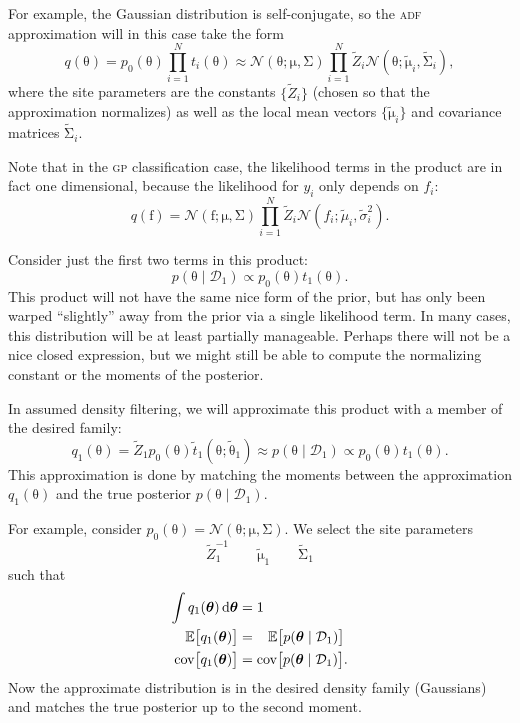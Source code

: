 \documentclass{article}
\newcommand{\acro}[1]{\textsc{\MakeLowercase{#1}}}
\newcommand{\given}{\mid}
\newcommand{\mc}[1]{\mathcal{#1}}
\newcommand{\data}{\mc{D}}
\newcommand{\intd}[1]{\,\mathrm{d}{#1}}
\newcommand{\mat}[1]{\bm{\mathrm{#1}}}
\renewcommand{\vec}[1]{\bm{\mathrm{#1}}}
\DeclareMathOperator{\cov}{cov}
\begin{document}
For example, the Gaussian distribution is self-conjugate, so the
\acro{ADF} approximation will in this case take the form
\[
  q(\vec{\theta})
  =
  p_0(\vec{\theta})
  \prod_{i=1}^N t_i(\vec{\theta})
  \approx
  \mc{N}(\vec{\theta}; \vec{\mu}, \mat{\Sigma})
  \prod_{i=1}^N
  \tilde{Z}_i
  \mc{N}(\vec{\theta}; \tilde{\vec{\mu}}_i, \tilde{\mat{\Sigma}}_i),
\]
where the site parameters are the constants $\{\tilde{Z}_i\}$ (chosen
so that the approximation normalizes) as well as the local mean
vectors $\{\tilde{\vec{\mu}}_i\}$ and covariance matrices
$\tilde{\mat{\Sigma}}_i$.

Note that in the \acro{GP} classification case, the likelihood terms
in the product are in fact one dimensional, because the likelihood for
$y_i$ only depends on $f_i$:
\[
  q(\vec{f})
  =
  \mc{N}(\vec{f}; \vec{\mu}, \mat{\Sigma})
  \prod_{i=1}^N
  \tilde{Z}_i
  \mc{N}(f_i; \tilde{\mu}_i, \tilde{\sigma}^2_i).
\]

Consider just the first two terms in this product:
\[
  p(\vec{\theta} \given \data_1)
  \propto
  p_0(\vec{\theta})
  t_1(\vec{\theta}).
\]
This product will not have the same nice form of the prior, but has
only been warped ``slightly'' away from the prior via a single
likelihood term.  In many cases, this distribution will be at least
partially manageable.  Perhaps there will not be a nice closed
expression, but we might still be able to compute the normalizing
constant or the moments of the posterior.

In assumed density filtering, we will approximate this product with a
member of the desired family:
\[
  q_1(\vec{\theta})
  =
  \tilde{Z}_1
  p_0(\vec{\theta})
  \tilde{t}_1(\vec{\theta}; \tilde{\vec{\theta}}_1)
  \approx
  p(\vec{\theta} \given \data_1)
  \propto
  p_0(\vec{\theta})
  t_1(\vec{\theta}).
\]
This approximation is done by matching the moments between the
approximation $q_1(\vec{\theta})$ and the true posterior
$p(\vec{\theta} \given \data_1)$.

For example, consider $p_0(\vec{\theta}) = \mc{N}(\vec{\theta};
\vec{\mu}, \mat{\Sigma})$.  We select the site parameters
\[
  \tilde{Z}_1^{-1}
  \qquad
  \tilde{\vec{\mu}}_1 \qquad
  \tilde{\mat{\Sigma}}_1
\]
such that
\begin{align*}
  \int q_1(\vec{\theta}) \intd{\vec{\theta}} &= 1 \\
  \mathbb{E}\bigl[q_1(\vec{\theta})\bigr] &= \mspace{14.5mu} \mathbb{E}\bigl[ p(\vec{\theta} \given \data_1) \bigr] \\
  \cov\bigl[q_1(\vec{\theta})\bigr] &= \cov\bigl[ p(\vec{\theta} \given \data_1) \bigr].
\end{align*}
Now the approximate distribution is in the desired density family
(Gaussians) and matches the true posterior up to the second moment.
\end{document}
